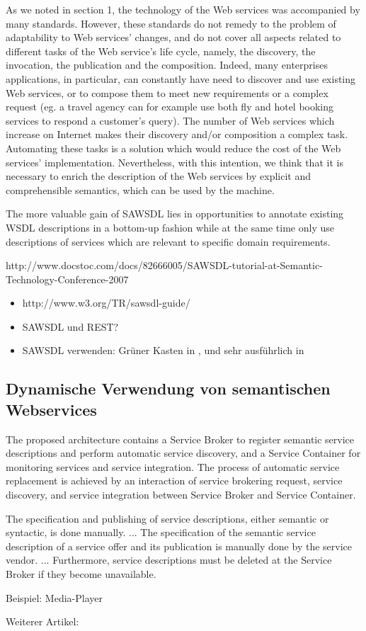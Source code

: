 As we noted in section 1, the technology of the Web
services was accompanied by many standards. However,
these standards do not remedy to the problem of adaptability
to Web services’ changes, and do not cover all aspects related
to different tasks of the Web service’s life cycle, namely, the
discovery, the invocation, the publication and the
composition. Indeed, many enterprises applications, in
particular, can constantly have need to discover and use
existing Web services, or to compose them to meet new
requirements or a complex request (eg. a travel agency can
for example use both fly and hotel booking services to
respond a customer’s query). The number of Web services
which increase on Internet makes their discovery and/or
composition a complex task. Automating these tasks is a
solution which would reduce the cost of the Web services’
implementation. Nevertheless, with this intention, we think
that it is necessary to enrich the description of the Web
services by explicit and comprehensible semantics, which can
be used by the machine. \cite{ei-sawsdl}

The more valuable
gain of SAWSDL lies in opportunities to annotate existing
WSDL descriptions in a bottom-up fashion while at the
same time only use descriptions of services which are relevant
to specific domain requirements. \cite{WSMOLITE}

http://www.docstoc.com/docs/82666005/SAWSDL-tutorial-at-Semantic-Technology-Conference-2007

\begin{itemize}
\item http://www.w3.org/TR/sawsdl-guide/
\item \ac{SAWSDL} und \ac{REST}? \cite{xn-sss}
\item \ac{SAWSDL} verwenden: Grüner Kasten in \cite[S.63]{ky-sawsdl}, \cite{flexbrok} und sehr ausführlich in \cite{vr-sesa}
\end{itemize}

\subsection{Dynamische Verwendung von semantischen Webservices}

The proposed architecture contains a Service Broker to
register semantic service descriptions and perform automatic
service discovery, and a Service Container for monitoring
services and service integration. The process of automatic
service replacement is achieved by an interaction of service
brokering request, service discovery, and service integration
between Service Broker and Service Container. \cite[S.410]{flexbrok}

The specification
and publishing of service descriptions, either semantic
or syntactic, is done manually. ... The specification
of the semantic service description of a service offer and its
publication is manually done by the service vendor. ... Furthermore, service descriptions must be deleted at the
Service Broker if they become unavailable. \cite[S.416]{flexbrok}

Beispiel: Media-Player \cite[S.418]{flexbrok}

Weiterer Artikel: \cite{ccube}

